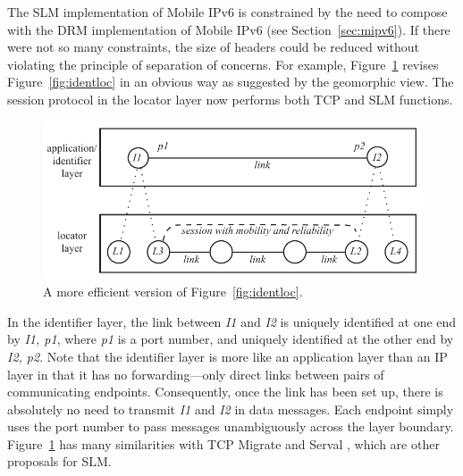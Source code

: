 The SLM implementation of Mobile IPv6 is constrained by the need to
compose with the DRM implementation of Mobile
IPv6 (see Section~\ref{sec:mipv6}).
If there were not so many constraints,
the size of
headers could be reduced without violating the principle of separation
of concerns.
For example, Figure~\ref{fig:identloc2} revises
Figure~\ref{fig:identloc} in an obvious way as suggested by the
geomorphic view.
The session protocol in the locator layer now performs both TCP and SLM
functions.

\begin{figure}
\centering
\includegraphics[scale=0.80]{figures/identloc2.pdf}
\caption{A more efficient version of Figure~\ref{fig:identloc}.}
\label{fig:identloc2}
\end{figure}

In the identifier layer, the link between {\it I1} and {\it I2}
is uniquely identified at one end by {\it I1, p1}, where {\it p1}
is a port number, and uniquely identified at the other end by
{\it I2, p2}.
Note that
the identifier layer is more like an application layer than an IP
layer in that it has no forwarding---only direct links between pairs
of communicating endpoints.
Consequently, once the link has been set up, there is absolutely
no need to transmit {\it I1} and {\it I2} in data messages.
Each endpoint simply uses the port number to pass messages unambiguously
across the layer boundary.
Figure~\ref{fig:identloc2} has many similarities with TCP Migrate
\cite{tcp-migrate} and Serval \cite{serval,serval-icnp}, which are other
proposals for SLM.
